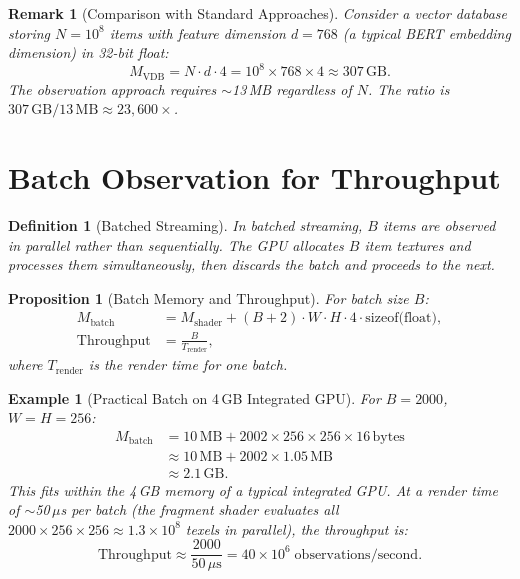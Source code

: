 \documentclass[11pt,twocolumn,a4paper]{article}
\newtheorem{proposition}[theorem]{Proposition}
\newtheorem{definition}[theorem]{Definition}
\newtheorem{remark}[theorem]{Remark}
\newtheorem{example}[theorem]{Example}
\newcommand{\Mshader}{M_{\mathrm{shader}}}
\begin{document}
\begin{remark}[Comparison with Standard Approaches]
Consider a vector database storing $N = 10^8$ items with feature
dimension $d = 768$ (a typical BERT embedding dimension) in 32-bit
float:
\begin{equation}
M_{\mathrm{VDB}} = N \cdot d \cdot 4 = 10^8 \times 768 \times 4
  \approx 307\,\text{GB}.
\end{equation}
The observation approach requires $\sim$13\,MB regardless of $N$.
The ratio is $307\,\text{GB} / 13\,\text{MB} \approx 23{,}600\times$.
\end{remark}


\section{Batch Observation for Throughput}
\label{sec:batch}

\begin{definition}[Batched Streaming]
\label{def:batch}
In batched streaming, $B$ items are observed in parallel rather than
sequentially. The GPU allocates $B$ item textures and processes them
simultaneously, then discards the batch and proceeds to the next.
\end{definition}

\begin{proposition}[Batch Memory and Throughput]
\label{prop:batch}
For batch size $B$:
\begin{align}
M_{\mathrm{batch}} &= \Mshader + (B + 2) \cdot W \cdot H
  \cdot 4 \cdot \text{sizeof(float)}, \\
\text{Throughput} &= \frac{B}{T_{\mathrm{render}}},
\label{eq:batch}
\end{align}
where $T_{\mathrm{render}}$ is the render time for one batch.
\end{proposition}

\begin{example}[Practical Batch on 4\,GB Integrated GPU]
For $B = 2000$, $W = H = 256$:
\begin{align}
M_{\mathrm{batch}} &= 10\,\text{MB}
  + 2002 \times 256 \times 256 \times 16\,\text{bytes}
\nonumber\\
&\approx 10\,\text{MB} + 2002 \times 1.05\,\text{MB}
\nonumber\\
&\approx 2.1\,\text{GB}.
\end{align}
This fits within the 4\,GB memory of a typical integrated GPU.
At a render time of $\sim$50\,$\mu$s per batch (the fragment shader
evaluates all $2000 \times 256 \times 256 \approx 1.3 \times 10^8$
texels in parallel), the throughput is:
\begin{equation}
\text{Throughput} \approx \frac{2000}{50\,\mu\text{s}}
  = 40 \times 10^6 \;\text{observations/second}.
\end{equation}
\end{example}
\end{document}
